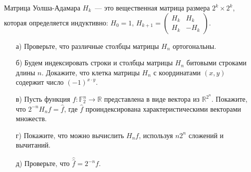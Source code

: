 \begin{task}
	Матрица Уолша-Адамара $H_k$~--- это вещественная матрица размера $2^k \times 2^k$, которая определяется индуктивно: $H_0 = 1$,
    $H_{k + 1} = \left( \begin{array}{cc} H_k & H_k \\ H_k & -H_k \end{array} \right)$.

    \begin{enumerate}[topsep = 0pt, itemsep = -1ex]
        \item [а)] Проверьте, что различные столбцы матрицы $H_n$ ортогональны.
        \item [б)] Будем индексировать строки и столбцы матрицы $H_n$ битовыми строками длины $n$. Докажите, что клетка матрицы
    		$H_n$ с координатами $(x, y)$ содержит число $(-1)^{x \cdot y}$.
		\item [в)] Пусть функция $f: \mathbb{F}_2^n \to \mathbb{R}$ представлена в виде вектора из $\mathbb{R}^{2^n}$. Покажите,
			что $2^{-n}H_n f = \hat f$, где $\hat f$ проиндексирована характеристическими векторами множеств.
		\item [г)] Покажите, что можно вычислить $H_n f$, используя $n 2^n$ сложений и вычитаний.
		\item [д)] Проверьте, что $\hat {\hat f} = 2^{-n}f$.
	\end{enumerate}
\end{task}


